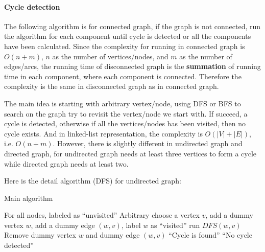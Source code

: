             \paragraph{Cycle detection}
                The following algorithm is for connected graph, if the graph is not connected, run the algorithm for each component until cycle is detected or all the components have been calculated. Since the complexity for running in connected graph is $O(n + m)$, $n$ as the number of vertices/nodes, and $m$ as the number of edges/arcs, the running time of disconnected graph is the \textbf{summation} of running time in each component, where each component is connected. Therefore the complexity is the same in disconnected graph as in connected graph.

                The main idea is starting with arbitrary vertex/node, using DFS or BFS to search on the graph try to revisit the vertex/node we start with. If succeed, a cycle is detected, otherwise if all the vertices/nodes has been visited, then no cycle exists. And in linked-list representation, the complexity is $O(|V| + |E|)$, i.e. $O(n + m)$. However, there is slightly different in undirected graph and directed graph, for undirected graph needs at least three vertices to form a cycle while directed graph needs at least two.

                Here is the detail algorithm (DFS) for undirected graph:
                \begin{algorithm}[H]
                    \caption{Main algorithm}
                    \begin{algorithmic}[1]
                        \State For all nodes, labeled as ``unvisited''
                        \State Arbitrary choose a vertex $v$, add a dummy vertex $w$, add a dummy edge $(w, v)$, label $w$ as ``visited''
                        \State run $DFS(w, v)$
                        \State Remove dummy vertex $w$ and dummy edge $(w, v)$
                            \State \Return ``Cycle is found''
                        \Else
                            \State \Return ``No cycle detected''
                        \EndIf
                    \end{algorithmic}
                \end{algorithm}

